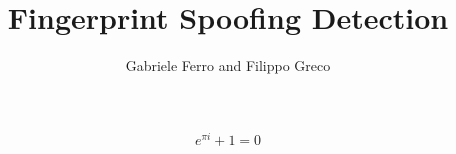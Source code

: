 \documentclass[12pt]{article}
\title{Fingerprint Spoofing Detection}
\author{Gabriele Ferro and Filippo Greco}
\begin{document}
\maketitle

\begin{equation} e^{\pi i} + 1 = 0 \end{equation}
\end{document}
